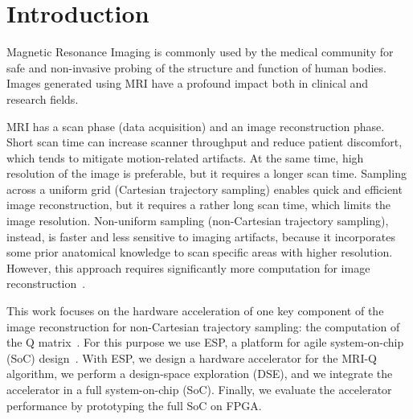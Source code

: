 \section{Introduction}
\label{sec:intro}

Magnetic Resonance Imaging is commonly used by the medical community for safe
and non-invasive probing of the structure and function of human bodies. Images
generated using MRI have a profound impact both in clinical and research
fields.

MRI has a scan phase (data acquisition) and an image reconstruction phase. Short
scan time can increase scanner throughput and reduce patient discomfort, which
tends to mitigate motion-related artifacts. At the same time, high resolution of
the image is preferable, but it requires a longer scan time.
%
Sampling across a uniform grid (Cartesian trajectory sampling) enables quick and
efficient image reconstruction, but it requires a rather long scan time, which
limits the image resolution. Non-uniform sampling (non-Cartesian trajectory
sampling), instead, is faster and less sensitive to imaging artifacts, because
it incorporates some prior anatomical knowledge to scan specific areas with
higher resolution. However, this approach requires significantly more
computation for image reconstruction~\cite{stone2008accelerating}.

This work focuses on the hardware acceleration of one key component of the image
reconstruction for non-Cartesian trajectory sampling: the computation of the Q
matrix~\cite{stratton2012parboil}. For this purpose we use ESP, a platform for
agile system-on-chip (SoC) design~\cite{esp-website, esp-release}. With ESP, we
design a hardware accelerator for the MRI-Q algorithm, we perform a design-space
exploration (DSE), and we integrate the accelerator in a full system-on-chip
(SoC). Finally, we evaluate the accelerator performance by prototyping the full
SoC on FPGA.
